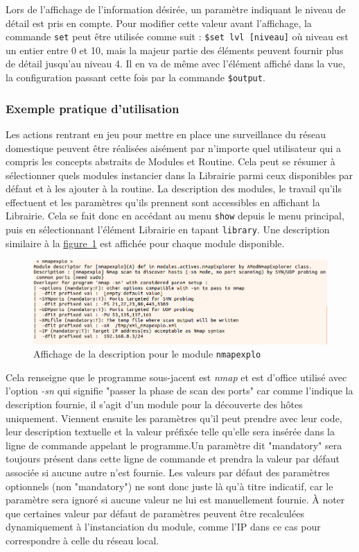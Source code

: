 \documentclass[]{article}
\newcommand{\wordlink}[2]{\hyperref[#1]{#2~\ref{#1}}}
\begin{document}
\par Lors de l'affichage de l'information désirée, un paramètre indiquant le niveau de détail est pris en compte. Pour modifier cette valeur avant l'affichage, la commande \texttt{set} peut être utilisée comme suit : \texttt{\$set lvl [niveau]} où niveau est un entier entre 0 et 10, mais la majeur partie des éléments peuvent fournir plus de détail jusqu'au niveau 4. Il en va de même avec l'élément affiché dans la vue, la configuration passant cette fois par la commande \texttt{\$output}.

\subsubsection{Exemple pratique d'utilisation}

Les actions rentrant en jeu pour mettre en place une surveillance du réseau domestique peuvent être réalisées aisément par n'importe quel utilisateur qui a compris les concepts abstraits de Modules et Routine. Cela peut se résumer à sélectionner quels modules instancier dans la Librairie parmi ceux disponibles par défaut et à les ajouter à la routine. La description des modules, le travail qu'ils effectuent et les paramètres qu'ils prennent sont accessibles en affichant la Librairie. Cela se fait donc en accédant au menu \texttt{show} depuis le menu principal, puis en sélectionnant l'élément Librairie en tapant \texttt{library}. Une description similaire à la \wordlink{showlib}{figure} est affichée pour chaque module disponible.

\begin{figure}[!ht]
\centering
     \includegraphics[width=0.9\linewidth]{showlib}
     \caption{Affichage de la description pour le module \texttt{nmapexplo}}
     \label{showlib}
\end{figure}

Cela renseigne que le programme sous-jacent est \textit{nmap} et est d'office utilisé avec l'option \textit{-sn} qui signifie "passer la phase de scan des ports" car comme l'indique la description fournie, il s'agit d'un module pour la découverte des hôtes uniquement. Viennent ensuite les paramètres qu'il peut prendre avec leur code, leur description textuelle et la valeur préfixée telle qu'elle sera insérée dans la ligne de commande appelant le programme.Un paramètre dit "mandatory" sera toujours présent dans cette ligne de commande et prendra la valeur par défaut associée si aucune autre n'est fournie. Les valeurs par défaut des paramètres optionnels (non "mandatory") ne sont donc juste là qu'à titre indicatif, car le paramètre sera ignoré si aucune valeur ne lui est manuellement fournie. À noter que certaines valeur par défaut de paramètres peuvent être recalculées dynamiquement à l’instanciation du module, comme l'IP dans ce cas pour correspondre à celle du réseau local.\\
\end{document}
